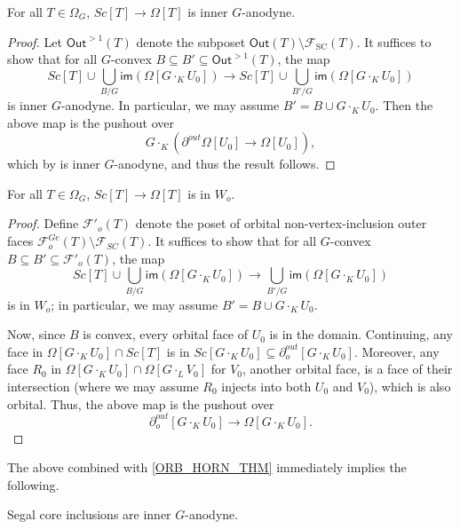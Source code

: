\documentclass[a4paper,10pt,draft]{article}%
\numberwithin{equation}{section}%
\numberwithin{figure}{section}
\begin{document}
\begin{proposition}
      \label{SC_IN_GHORN_THM}
      For all $T \in \Omega_G$, $Sc[T] \to \Omega[T]$ is inner $G$-anodyne.
\end{proposition}
\begin{proof}
      Let $\mathsf{Out}^{>1}(T)$ denote the subposet $\mathsf{Out}(T) \setminus \mathscr{F}_{\mathrm{SC}}(T)$.
      It suffices to show that for all $G$-convex $B \subseteq B' \subseteq \mathsf{Out}^{>1}(T)$, the map
      \begin{equation}
            Sc[T] \cup \mathop{\bigcup}\limits_{B/G}\mathsf{im}(\Omega[G \cdot_K U_0])
            \to
            Sc[T] \cup \mathop{\bigcup}\limits_{B'/G}\mathsf{im}(\Omega[G \cdot_K U_0])
      \end{equation}
      is inner $G$-anodyne. In particular, we may assume $B' = B \cup G \cdot_K U_0$.
      Then the above map is the pushout over
      \begin{equation}
                  G\cdot_K \left(\partial^{out}\Omega[U_0] \to \Omega[U_0] \right),
      \end{equation}
      which by \cite[Proposition 6.17]{Per17} is inner $G$-anodyne,
      and thus the result follows.
\end{proof}
\begin{proposition}
      \label{SC_IN_OHORN_THM}
      For all $T \in \Omega_G$, $Sc[T] \to \Omega[T]$ is in $W_o$. 
\end{proposition}
\begin{proof}
      Define $\mathscr{F}'_{o}(T)$ denote the poset of orbital non-vertex-inclusion outer faces
      $\mathscr{F}_{o}^{G e}(T) \setminus \mathscr{F}_{SC}(T)$.
      It suffices to show that for all $G$-convex $B \subseteq B' \subseteq \mathscr{F}'_o(T)$, the map
      \begin{equation}
            Sc[T] \cup \mathop{\bigcup}\limits_{B/G}\mathsf{im}\left(\Omega[G \cdot_K U_0]\right)
            \to
            \mathop{\bigcup}\limits_{B'/G}\mathsf{im}\left(\Omega[G \cdot_K U_0]\right)
      \end{equation}
      is in $W_o$; in particular, we may assume $B' = B \cup G \cdot_K U_0$.

      Now, since $B$ is convex, every orbital face of $U_0$ is in the domain.
      Continuing, any face in $\Omega[G \cdot_K U_0] \cap Sc[T]$ is in $Sc[G \cdot_K U_0] \subseteq \partial^{out}_o[G \cdot_K U_0]$.
      Moreover, any face $R_0$ in $\Omega[G \cdot_K U_0] \cap \Omega[G \cdot_L V_0]$ for $V_0$, another orbital face,
      is a face of their intersection (where we may assume $R_0$ injects into both $U_0$ and $V_0$),
      which is also orbital.
      Thus, the above map is the pushout over
      \begin{equation}
            \partial^{out}_o[G \cdot_K U_0] \to \Omega[G \cdot_K U_0].
      \end{equation}
\end{proof}
The above combined with \cref{ORB_HORN_THM} immediately implies the following.
\begin{corollary}
      Segal core inclusions are inner $G$-anodyne.
\end{corollary}
\end{document}
